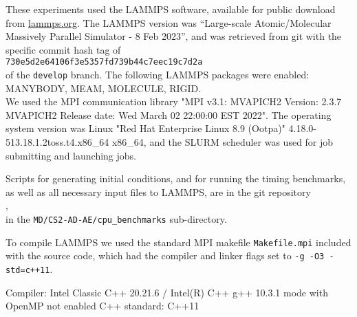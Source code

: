 \documentclass[conference]{IEEEtran}
\begin{document}

These experiments used the LAMMPS software, available for public download from \url{lammps.org}. The LAMMPS version was ``Large-scale Atomic/Molecular Massively Parallel Simulator - 8 Feb 2023'', and was retrieved from git with the specific commit hash tag of\\
\phantom{xxx}\texttt{730e5d2e64106f3e5357fd739b44c7eec19c7d2a}\\ of the \texttt{develop} branch. The following LAMMPS packages were enabled:\\ \phantom{xxx}MANYBODY, MEAM, MOLECULE, RIGID.\\
%
We used the MPI communication library "MPI v3.1: MVAPICH2 Version: 2.3.7
MVAPICH2 Release date: Wed March 02 22:00:00 EST 2022".
%
The operating system version was Linux "Red Hat Enterprise Linux 8.9 (Ootpa)" 4.18.0-513.18.1.2toss.t4.x86\_64 x86\_64, and the SLURM scheduler was used for job submitting and launching jobs.


Scripts for generating initial conditions, and for running the timing benchmarks, as well as all necessary input files to LAMMPS, are in the git repository\\ \phantom{xxx}\gitrepo,\\ in the \texttt{MD/CS2-AD-AE/cpu\_benchmarks} sub-directory.




To compile LAMMPS we used the standard MPI makefile \texttt{Makefile.mpi} included with the source code, which had the compiler and linker flags set to \texttt{-g -O3 -std=c++11}.

Compiler: Intel Classic C++ 20.21.6 / Intel(R) C++ g++ 10.3.1 mode with OpenMP not enabled
C++ standard: C++11


\artcomp

\end{document}
